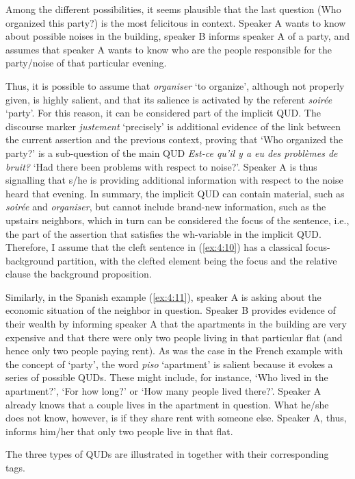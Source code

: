 Among the different possibilities, it seems plausible that the last question (Who organized this party?) is the most felicitous in context. Speaker A wants to know about possible noises in the building, speaker B informs speaker A of a party, and assumes that speaker A wants to know who are the people responsible for the party/noise of that particular evening. 

Thus, it is possible to assume that \textit{organiser} `to organize', although not properly given, is highly salient, and that its salience is activated by the referent \textit{soirée} `party'. For this reason, it can be considered part of the implicit QUD. The discourse marker \textit{justement} `precisely' is additional evidence of the link between the current assertion and the previous context, proving that ‘Who organized the party?’ is a sub-question of the main QUD \textit{Est-ce qu'il y a eu des problèmes de bruit?} `Had there been
problems with respect to noise?'. Speaker A is thus signalling that s/he is providing additional information with respect to the noise heard that evening.
In summary, the implicit QUD can contain material, such as \textit{soirée} and \textit{organiser}, but cannot include brand-new information, such as the upstairs neighbors, which in turn can be considered the focus of the sentence, i.e., the part of the assertion that satisfies the wh-variable in the implicit QUD.
Therefore, I assume that the cleft sentence in (\ref{ex:4:10}) has a classical focus-background partition, with the clefted element being the focus and the relative clause the background proposition.

Similarly, in the Spanish example (\ref{ex:4:11}), speaker A is asking about the economic situation of the neighbor in question. Speaker B provides evidence of their wealth by informing speaker A that the apartments in the building are very expensive and that there were only two people living in that particular flat (and hence only two people paying rent). As was the case in the French example with the concept of `party', the word \textit{piso} `apartment' is salient because it evokes a series of possible QUDs. These might include, for instance, `Who lived in the apartment?', `For how long?' or `How many people lived there?'. Speaker A already knows that a couple lives in the apartment in question. What he/she does not know, however, is if they share rent with someone else. Speaker A, thus, informs him/her that only two people live in that flat.

The three types of QUDs are illustrated in  together with their corresponding tags.

